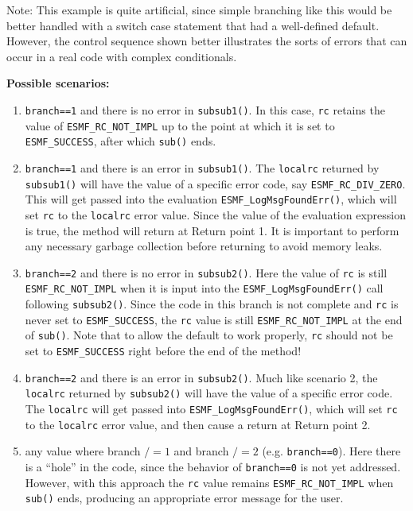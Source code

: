 Note: This example is quite artificial, since simple branching like this would be better handled with a switch case statement that had a well-defined default. However, the control sequence shown better illustrates the sorts of errors that can occur in a real code with complex conditionals.

{\bf Possible scenarios:}
\begin{enumerate}
\item {\tt branch==1} and there is no error in {\tt subsub1()}. In this case, {\tt rc} retains the value of {\tt ESMF\_RC\_NOT\_IMPL} up to the point at which it is set to {\tt ESMF\_SUCCESS}, after which {\tt sub()} ends.

\item {\tt branch==1} and there is an error in {\tt subsub1()}. The {\tt localrc} returned by {\tt subsub1()} will have the value of a specific error code, say {\tt ESMF\_RC\_DIV\_ZERO}. This will get passed into the evaluation {\tt ESMF\_LogMsgFoundErr()}, which will set {\tt rc} to the {\tt localrc} error value. Since the value of the evaluation expression is true, the method will return at Return point 1. It is important to perform any necessary garbage collection before returning to avoid memory leaks.

\item {\tt branch==2} and there is no error in {\tt subsub2()}. Here the value of {\tt rc} is still {\tt ESMF\_RC\_NOT\_IMPL} when it is input into the {\tt ESMF\_LogMsgFoundErr()} call following {\tt subsub2()}. Since the code in this branch is not complete and {\tt rc} is never set to {\tt ESMF\_SUCCESS}, the {\tt rc} value is still {\tt ESMF\_RC\_NOT\_IMPL} at the end of {\tt sub()}. Note that to allow the default to work properly, {\tt rc} should not be set to {\tt ESMF\_SUCCESS} right before the end of the method!

\item {\tt branch==2} and there is an error in {\tt subsub2()}. Much like scenario 2, the {\tt localrc} returned by {\tt subsub2()} will have the value of a specific error code. The {\tt localrc} will get passed into {\tt ESMF\_LogMsgFoundErr()}, which will set {\tt rc} to the {\tt localrc} error value, and then cause a return at Return point 2.

\item any value where branch $/=1$ and branch $/= 2$ (e.g. {\tt branch==0}). Here there is a ``hole'' in the code, since the behavior of {\tt branch==0} is not yet addressed. However, with this approach the {\tt rc} value remains {\tt ESMF\_RC\_NOT\_IMPL} when {\tt sub()} ends, producing an appropriate error message for the user.


\end{enumerate}
